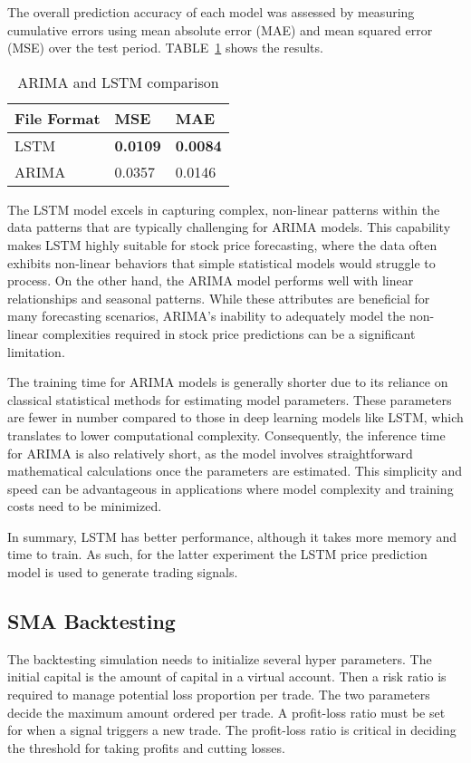 \documentclass[conference]{IEEEtran}
\begin{document}
The overall prediction accuracy of each model was assessed by measuring cumulative errors using mean absolute error (MAE) and mean squared error (MSE) over the test period. TABLE~\ref{price} shows the results.
 
 \begin{table}[tb]
\caption{ARIMA and LSTM comparison}
\begin{center}
\begin{tabular}{|p{}|p{}|p{}|}
\hline
\textbf{File Format} & \textbf{MSE} & \textbf{MAE} \\
\hline
LSTM & \textbf{0.0109} &  \textbf{0.0084}\\
\hline
ARIMA & 0.0357 & 0.0146\\
\hline
\end{tabular}
\label{price}
\end{center}
\end{table}

The LSTM model excels in capturing complex, non-linear patterns within the data patterns that are typically challenging for ARIMA models. This capability makes LSTM highly suitable for stock price forecasting, where the data often exhibits non-linear behaviors that simple statistical models would struggle to process. On the other hand, the ARIMA model performs well with linear relationships and seasonal patterns. While these attributes are beneficial for many forecasting scenarios, ARIMA's inability to adequately model the non-linear complexities required in stock price predictions can be a significant limitation.

The training time for ARIMA models is generally shorter due to its reliance on classical statistical methods for estimating model parameters. These parameters are fewer in number compared to those in deep learning models like LSTM, which translates to lower computational complexity. Consequently, the inference time for ARIMA is also relatively short, as the model involves straightforward mathematical calculations once the parameters are estimated. This simplicity and speed can be advantageous in applications where model complexity and training costs need to be minimized.

In summary, LSTM has better performance, although it takes more memory and time to train. As such, for the latter experiment the LSTM price prediction model is used to generate trading signals.


\subsection{SMA Backtesting}
The backtesting simulation needs to initialize several hyper parameters. The initial capital is the amount of capital in a virtual account. Then  a risk ratio is required to manage potential loss proportion per trade. The two parameters decide the maximum amount ordered per trade. A profit-loss ratio must be set for when a signal triggers a new trade. The profit-loss ratio is critical in deciding the threshold for taking profits and cutting losses. 
\end{document}
